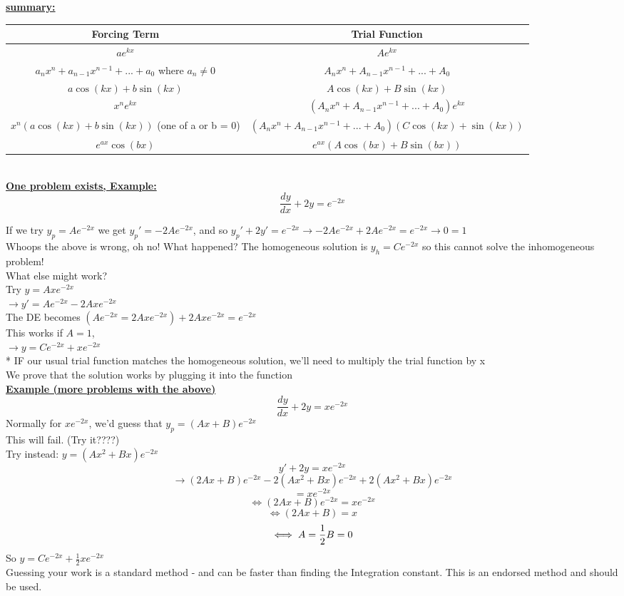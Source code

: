 \documentclass[12pt]{article}
\newcommand{\myt}[1]{\textbf{\underline{#1}}}
\begin{document}
	\myt{summary:}\\
	\begin{tabular}{c | c}
		Forcing Term & Trial Function \\
		\hline 
		$ae^{kx}$ & $Ae^{kx}$ \\
		$a_nx^n + a_{n-1}x^{n-1} + ... + a_0$ where $a_n \ne 0$ & $A_nx^n + A_{n-1}x^{n-1} + ... + A_0$\\
		$a\cos(kx) + b\sin(kx)$ & $A\cos(kx) + B\sin(kx)$ \\ 
		$x^ne^{kx}$ & $(A_nx^n + A_{n-1}x^{n-1} + ... + A_0)e^{kx}$\\
		$x^n(a\cos(kx) + b\sin(kx))$ (one of a or b = 0) & $(A_nx^{n}+A_{n-1}x^{n-1}+ ... + A_0)(C\cos(kx) + \sin(kx))$\\
		$e^{ax}\cos(bx)$ & $e^{ax}(A\cos(bx) + B\sin(bx))$\\
	\end{tabular}\\

	\myt{One problem exists, Example:}\\
	$$\frac{dy}{dx} + 2y = e^{-2x}$$
	
	If we try $y_p = Ae^{-2x}$ we get $y_p' = -2Ae^{-2x}$, and so $y_p' + 2y' = e^{-2x} \rightarrow -2Ae^{-2x} + 2Ae^{-2x} = e^{-2x} \rightarrow 0 = 1$\\
	
	Whoops the above is wrong, oh no! What happened? The homogeneous solution is $y_h = Ce^{-2x}$ so this cannot solve the inhomogeneous problem!\\
	
	What else might work?\\
	Try $y = Axe^{-2x}$\\
	$\rightarrow y' = Ae^{-2x} - 2Axe^{-2x}$\\
	The DE becomes $(Ae^{-2x} = 2Axe^{-2x}) + 2Axe^{-2x} = e^{-2x}$\\
	This works if $A = 1$,\\
	$\rightarrow y = Ce^{-2x} + xe^{-2x}$\\
	
	* IF our usual trial function matches the homogeneous solution, we'll need to multiply the trial function by x\\
	We prove that the solution works by plugging it into the function\\
	
	\myt{Example (more problems with the above)}\\
	$$\frac{dy}{dx} + 2y = xe^{-2x}$$
	Normally for $xe^{-2x}$, we'd guess that $y_p = (Ax + B)e^{-2x}$\\
	This will fail. (Try it????)\\
	Try instead: $y = (Ax^2 + Bx)e^{-2x}$\\
	$$y' + 2y = xe^{-2x}$$
	$$\rightarrow (2Ax + B)e^{-2x} - 2(Ax^2+Bx)e^{-2x} + 2(Ax^2 + Bx)e^{-2x}$$
	$$= xe^{-2x}$$
	$$\iff (2Ax + B)e^{-2x} = xe^{-2x}$$
	$$\iff (2Ax + B) = x$$
	$$\iff A = \frac{1}{2} \space B = 0$$
	So $y = Ce^{-2x} + \frac{1}{2}xe^{-2x}$\\
	
	Guessing your work is a standard method - and can be faster than finding the Integration constant. This is an endorsed method and should be used.\\
	
	
	
\end{document}
